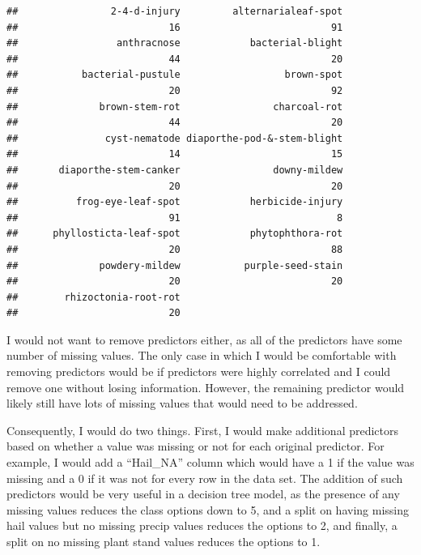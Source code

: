 \documentclass[]{book}
\newenvironment{Shaded}{\begin{snugshade}}{\end{snugshade}}
\newcommand{\CommentTok}[1]{\textcolor[rgb]{0.56,0.35,0.01}{\textit{#1}}}
\newcommand{\KeywordTok}[1]{\textcolor[rgb]{0.13,0.29,0.53}{\textbf{#1}}}
\newcommand{\NormalTok}[1]{#1}
\newcommand{\OperatorTok}[1]{\textcolor[rgb]{0.81,0.36,0.00}{\textbf{#1}}}
\begin{document}
\begin{Shaded}
\end{Shaded}

\begin{verbatim}
##                2-4-d-injury         alternarialeaf-spot 
##                          16                          91 
##                 anthracnose            bacterial-blight 
##                          44                          20 
##           bacterial-pustule                  brown-spot 
##                          20                          92 
##              brown-stem-rot                charcoal-rot 
##                          44                          20 
##               cyst-nematode diaporthe-pod-&-stem-blight 
##                          14                          15 
##       diaporthe-stem-canker                downy-mildew 
##                          20                          20 
##          frog-eye-leaf-spot            herbicide-injury 
##                          91                           8 
##      phyllosticta-leaf-spot            phytophthora-rot 
##                          20                          88 
##              powdery-mildew           purple-seed-stain 
##                          20                          20 
##        rhizoctonia-root-rot 
##                          20
\end{verbatim}

I would not want to remove predictors either, as all of the predictors have some number of missing values. The only case in which I would be comfortable with removing predictors would be if predictors were highly correlated and I could remove one without losing information. However, the remaining predictor would likely still have lots of missing values that would need to be addressed.

Consequently, I would do two things. First, I would make additional predictors based on whether a value was missing or not for each original predictor. For example, I would add a ``Hail\_NA'' column which would have a 1 if the value was missing and a 0 if it was not for every row in the data set. The addition of such predictors would be very useful in a decision tree model, as the presence of any missing values reduces the class options down to 5, and a split on having missing hail values but no missing precip values reduces the options to 2, and finally, a split on no missing plant stand values reduces the options to 1.
\end{document}
